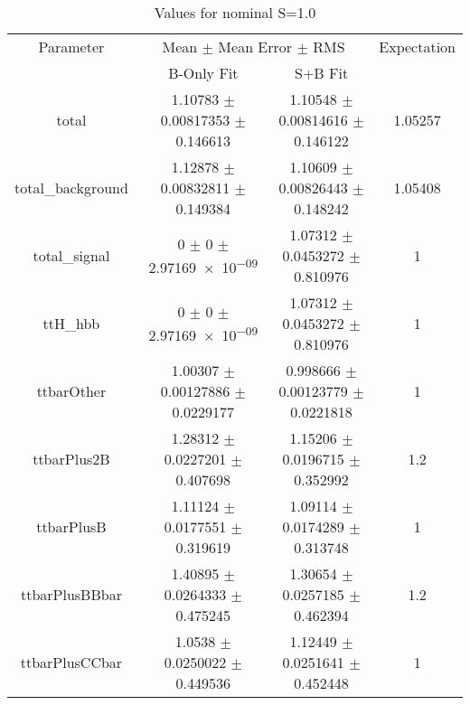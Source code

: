 \begin{table}
\centering
\caption{Values for nominal S=1.0}
\begin{tabular}{cccc}
\toprule
Parameter & \multicolumn{2}{c}{Mean $\pm$ Mean Error $\pm$ RMS} & Expectation\\
 & B-Only Fit & S+B Fit & \\
\midrule
total & \num{1.10783} $\pm$ \num{0.00817353} $\pm$ \num{0.146613} & \num{1.10548} $\pm$ \num{0.00814616} $\pm$ \num{0.146122} & \num{1.05257}\\
total\_background & \num{1.12878} $\pm$ \num{0.00832811} $\pm$ \num{0.149384} & \num{1.10609} $\pm$ \num{0.00826443} $\pm$ \num{0.148242} & \num{1.05408}\\
total\_signal & \num{0} $\pm$ \num{0} $\pm$ \num{2.97169e-09} & \num{1.07312} $\pm$ \num{0.0453272} $\pm$ \num{0.810976} & \num{1}\\
ttH\_hbb & \num{0} $\pm$ \num{0} $\pm$ \num{2.97169e-09} & \num{1.07312} $\pm$ \num{0.0453272} $\pm$ \num{0.810976} & \num{1}\\
ttbarOther & \num{1.00307} $\pm$ \num{0.00127886} $\pm$ \num{0.0229177} & \num{0.998666} $\pm$ \num{0.00123779} $\pm$ \num{0.0221818} & \num{1}\\
ttbarPlus2B & \num{1.28312} $\pm$ \num{0.0227201} $\pm$ \num{0.407698} & \num{1.15206} $\pm$ \num{0.0196715} $\pm$ \num{0.352992} & \num{1.2}\\
ttbarPlusB & \num{1.11124} $\pm$ \num{0.0177551} $\pm$ \num{0.319619} & \num{1.09114} $\pm$ \num{0.0174289} $\pm$ \num{0.313748} & \num{1}\\
ttbarPlusBBbar & \num{1.40895} $\pm$ \num{0.0264333} $\pm$ \num{0.475245} & \num{1.30654} $\pm$ \num{0.0257185} $\pm$ \num{0.462394} & \num{1.2}\\
ttbarPlusCCbar & \num{1.0538} $\pm$ \num{0.0250022} $\pm$ \num{0.449536} & \num{1.12449} $\pm$ \num{0.0251641} $\pm$ \num{0.452448} & \num{1}\\
\bottomrule
\end{tabular}
\end{table}